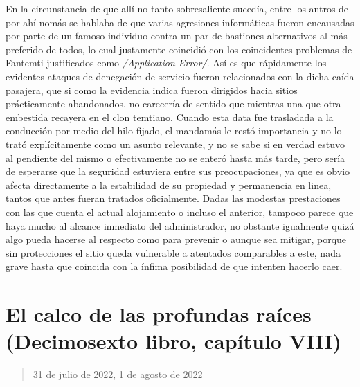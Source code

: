 \documentclass[
]{book}
\begin{document}
En la circunstancia de que allí no tanto sobresaliente sucedía, entre los antros de por ahí nomás se hablaba de que varias agresiones informáticas fueron encausadas por parte de un famoso individuo contra un par de bastiones alternativos al más preferido de todos, lo cual justamente coincidió con los coincidentes problemas de Fantemti justificados como \emph{/Application Error/}. Así es que rápidamente los evidentes ataques de denegación de servicio fueron relacionados con la dicha caída pasajera, que si como la evidencia indica fueron dirigidos hacia sitios prácticamente abandonados, no carecería de sentido que mientras una que otra embestida recayera en el clon temtiano. Cuando esta data fue trasladada a la conducción por medio del hilo fijado, el mandamás le restó importancia y no lo trató explícitamente como un asunto relevante, y no se sabe si en verdad estuvo al pendiente del mismo o efectivamente no se enteró hasta más tarde, pero sería de esperarse que la seguridad estuviera entre sus preocupaciones, ya que es obvio afecta directamente a la estabilidad de su propiedad y permanencia en linea, tantos que antes fueran tratados oficialmente. Dadas las modestas prestaciones con las que cuenta el actual alojamiento o incluso el anterior, tampoco parece que haya mucho al alcance inmediato del administrador, no obstante igualmente quizá algo pueda hacerse al respecto como para prevenir o aunque sea mitigar, porque sin protecciones el sitio queda vulnerable a atentados comparables a este, nada grave hasta que coincida con la ínfima posibilidad de que intenten hacerlo caer.

\hypertarget{el-calco-de-las-profundas-rauxedces-decimosexto-libro-capuxedtulo-viii}{%
\section{El calco de las profundas raíces (Decimosexto libro, capítulo VIII)}\label{el-calco-de-las-profundas-rauxedces-decimosexto-libro-capuxedtulo-viii}}

\begin{quote}
31 de julio de 2022, 1 de agosto de 2022
\end{quote}
\end{document}
